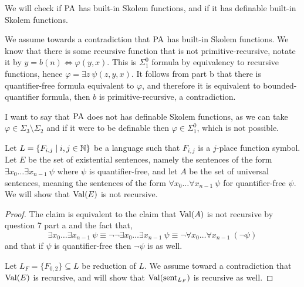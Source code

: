 \subquestion{}
We will check if $\operatorname{PA}$ has built-in Skolem functions, and if it has definable built-in Skolem functions.
\begin{solution}
	We assume towards a contradiction that $\operatorname{PA}$ has built-in Skolem functions.
	We know that there is some recursive function that is not primitive-recursive, notate it by $y = b(n) \iff \varphi(y, x)$.
	This is $\Sigma_1^0$ formula by equivalency to recursive functions, hence $\varphi = \exists z\ \psi(z, y, x)$.
	It follows from part b that there is quantifier-free formula equivalent to $\varphi$, and therefore it is equivalent to bounded-quantifier formula, then $b$ is primitive-recursive, a contradiction.

	I want to say that $\operatorname{PA}$ does not has definable Skolem functions, as we can take $\varphi \in \Sigma_3 \setminus \Sigma_2$ and if it were to be definable then $\varphi \in \Sigma_1^0$, which is not possible.
\end{solution}

\question{}
Let $L = \{ F_{i, j} \mid i, j \in \mathbb{N} \}$ be a language such that $F_{i, j}$ is a $j$-place function symbol.
Let $E$ be the set of existential sentences, namely the sentences of the form $\exists x_0 \ldots \exists x_{n - 1}\ \psi$ where $\psi$ is quantifier-free,
and let $A$ be the set of universal sentences, meaning the sentences of the form $\forall x_0 \ldots \forall x_{n - 1}\ \psi$ for quantifier-free $\psi$. \\
We will show that $\operatorname{Val}(E)$ is not recursive.
\begin{proof}
	The claim is equivalent to the claim that $\operatorname{Val}(A)$ is not recursive by question 7 part a and the fact that,
	\[
		\exists x_0 \ldots \exists x_{n - 1}\ \psi
		\equiv \lnot \lnot \exists x_0 \ldots \exists x_{n - 1}\ \psi
		\equiv \lnot \forall x_0 \ldots \forall x_{n - 1}\ (\lnot \psi)
	\]
	and that if $\psi$ is quantifier-free then $\lnot \psi$ is as well.

	Let $L_F = \{ F_{0, 2} \} \subseteq L$ be reduction of $L$.
	We assume toward a contradiction that $\operatorname{Val}(E)$ is recursive, and will show that $\operatorname{Val}(\operatorname{sent}_{L_F})$ is recursive as well.
\end{proof}



